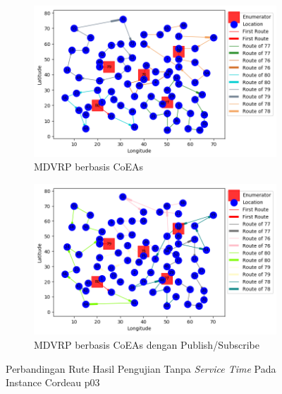 \begin{figure}[H]
	\centering
	\begin{subfigure}[t]{\textwidth}
		\centering
		\includegraphics[width=\textwidth]{Resources/Images/cordeau_p03/cordeau_p03_notw_coes}
		\caption{MDVRP berbasis CoEAs}
		\label{fig:cordeau_p03_notw_coes}
	\end{subfigure}
	\begin{subfigure}[t]{\textwidth}
		\centering
		\includegraphics[width=\textwidth]{Resources/Images/cordeau_p03/cordeau_p03_notw_pubsub_coes}
		\caption{MDVRP berbasis CoEAs dengan Publish/Subscribe}
		\label{fig:cordeau_p03_notw_pubsub_coes}
	\end{subfigure}
	\caption{Perbandingan Rute Hasil Pengujian Tanpa \textit{Service Time} Pada Instance Cordeau p03}
	\label{fig:cordeau_p03_notw}
\end{figure}


